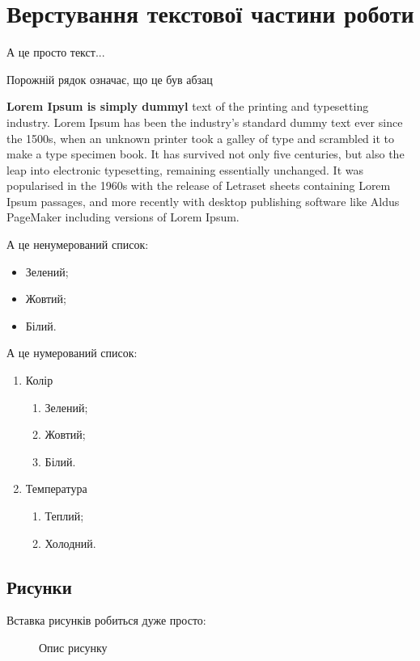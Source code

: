 \chapter{Верстування текстової частини роботи}
А це просто текст...

Порожній рядок означає, що це був абзац

\textbf{Lorem Ipsum is simply dummyl}  text of the printing and typesetting industry. Lorem Ipsum has been the industry's standard dummy text ever since the 1500s, when an unknown printer took a galley of type and scrambled it to make a type specimen book. It has survived not only five centuries, but also the leap into electronic typesetting, remaining essentially unchanged. It was popularised in the 1960s with the release of Letraset sheets containing Lorem Ipsum passages, and more recently with desktop publishing software like Aldus PageMaker including versions of Lorem Ipsum. 

А це ненумерований список:
\begin{itemize}
\item Зелений;
\item Жовтий;
\item Білий.
\end{itemize}

А це нумерований список:
\begin{enumerate}
\item Колір
      \begin{enumerate}
      \item Зелений;
      \item Жовтий;
      \item Білий.
      \end{enumerate}	
\item Температура
      \begin{enumerate}
      \item Теплий;
      \item Холодний.
      \end{enumerate}
\end{enumerate}
 

\section{Рисунки}

Вставка рисунків робиться дуже просто:

\begin{figure}[h]
\caption{Опис рисунку}
\end{figure}

